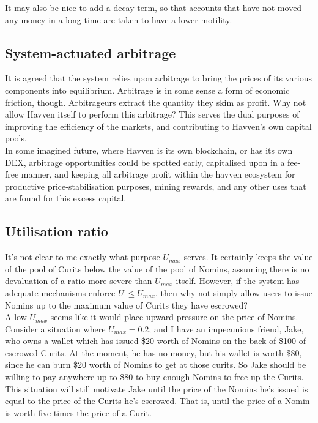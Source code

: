 \documentclass{article}
\begin{document}
\noindent It may also be nice to add a decay term, so that accounts that have not moved any money in a long time are taken to have a lower motility.

\subsection{System-actuated arbitrage}

It is agreed that the system relies upon arbitrage to bring the prices of its various components into equilibrium. Arbitrage is in some sense a form of economic friction, though. Arbitrageurs extract the quantity they skim as profit. Why not allow Havven itself to perform this arbitrage? This serves the dual purposes of improving the efficiency of the markets, and contributing to Havven's own capital pools.\\

\noindent In some imagined future, where Havven is its own blockchain, or has its own DEX, arbitrage opportunities could be spotted early, capitalised upon in a fee-free manner, and keeping all arbitrage profit within the havven ecosystem for productive price-stabilisation purposes, mining rewards, and any other uses that are found for this excess capital.

\pagebreak
\subsection{Utilisation ratio}

It's not clear to me exactly what purpose \(U_{max}\) serves. It certainly keeps the value of the pool of Curits below the value of the pool of Nomins, assuming there is no devaluation of a ratio more severe than \(U_{max}\) itself. However, if the system has adequate mechanisms enforce \(U\ \leq U_{max}\), then why not simply allow users to issue Nomins up to the maximum value of Curits they have escrowed? \\

\noindent A low \(U_{max}\) seems like it would place upward pressure on the price of Nomins. Consider a situation where \(U_{max} = 0.2\), and I have an impecunious friend, Jake, who owns a wallet which has issued \$20 worth of Nomins on the back of \$100 of escrowed Curits. At the moment, he has no
money, but his wallet is worth \$80, since he can burn \$20 worth of Nomins to get at those curits. So Jake should be willing to pay anywhere up to \$80 to buy enough Nomins to free up the Curits. This situation will still motivate Jake until the price of the Nomins he's issued is equal to the price of the Curits he's escrowed. That is, until the price of a Nomin is worth five times the price of a Curit.\\
\end{document}
